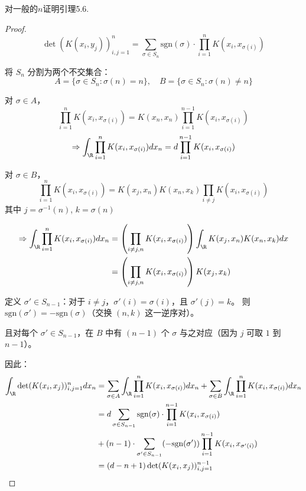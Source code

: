 \begin{2}
    对一般的$n$证明引理5.6.
\end{2}
\begin{proof}
    \[
\det(K(x_i, y_j))_{i,j=1}^n = \sum_{\sigma \in S_n} \text{sgn}(\sigma) \cdot \prod_{i=1}^n K(x_i, x_{\sigma(i)})
\]

将 $S_n$ 分割为两个不交集合：
\[
A = \{\sigma \in S_n : \sigma(n)=n\}, \quad B = \{\sigma \in S_n : \sigma(n) \neq n\}
\]

对 $\sigma \in A$，
\[
\prod_{i=1}^n K(x_i, x_{\sigma(i)}) = K(x_n, x_n) \prod_{i=1}^{n-1} K(x_i, x_{\sigma(i)})
\]
\[
\Rightarrow \int_{\R} \prod_{i=1}^n K(x_i, x_{\sigma(i)}) dx_n = d \prod_{i=1}^{n-1} K(x_i, x_{\sigma(i)})
\]

对 $\sigma \in B$，
\[
\prod_{i=1}^n K(x_i, x_{\sigma(i)}) = K(x_j, x_n) K(x_n, x_k) \prod_{i \neq j} K(x_i, x_{\sigma(i)})
\]
其中 $j = \sigma^{-1}(n)$, $k = \sigma(n)$

\begin{equation*}
    \begin{aligned}
        \Rightarrow \int_{\R} \prod_{i=1}^n K(x_i, x_{\sigma(i)}) dx_n &= \left( \prod_{i \neq j,n} K(x_i, x_{\sigma(i)}) \right) \int_{\R} K(x_j, x_n) K(x_n, x_k) dx\\
&= \left( \prod_{i \neq j,n} K(x_i, x_{\sigma(i)}) \right) K(x_j, x_k)
    \end{aligned}
\end{equation*}


定义 $\sigma' \in S_{n-1}$：对于 $i \neq j$，$\sigma'(i) = \sigma(i)$，且 $\sigma'(j) = k$。
则 $\text{sgn}(\sigma') = -\text{sgn}(\sigma)$（交换 $(n,k)$ 这一逆序对）。

且对每个 $\sigma' \in S_{n-1}$，在 $B$ 中有 $(n-1)$ 个 $\sigma$ 与之对应（因为 $j$ 可取 $1$ 到 $n-1$）。

因此：
\begin{equation*}
    \begin{aligned}
        \int_{\R} \det(K(x_i, x_j))_{i,j=1}^n dx_n &= \sum_{\sigma \in A} \int_{\R} \prod_{i=1}^n K(x_i, x_{\sigma(i)}) dx_n + \sum_{\sigma \in B} \int_{\R} \prod_{i=1}^n K(x_i, x_{\sigma(i)}) dx_n\\
        &= d \sum_{\sigma \in S_{n-1}} \text{sgn}(\sigma) \cdot \prod_{i=1}^{n-1} K(x_i, x_{\sigma(i)}) \\
        &+ (n-1) \cdot \sum_{\sigma' \in S_{n-1}} (-\text{sgn}(\sigma')) \prod_{i=1}^{n-1} K(x_i, x_{\sigma'(i)})\\
        &= (d-n+1) \det(K(x_i, x_j))_{i,j=1}^{n-1}
    \end{aligned}
\end{equation*}
\end{proof}

